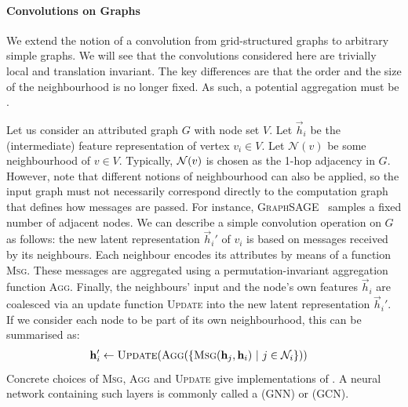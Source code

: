 \documentclass[
	fontsize=10pt, %
	twoside=true, %
	secnumdepth=1, %
  toc=indentunnumbered %
]{kaobook}
\begin{document}
\paragraph{Convolutions on Graphs} We extend the notion of a convolution
from grid-structured graphs to arbitrary simple graphs. We will see that
the convolutions considered here are trivially local and translation invariant.
The key differences are that the order and the size of the neighbourhood is no
longer fixed. As such, a potential aggregation must be .

Let us consider an attributed graph
$G$ with node set $V$.
Let $\vec h_i$ be the (intermediate) feature representation of vertex $v_i \in
V$. Let $\mathcal{N}(v)$ be some neighbourhood of $v \in V$. Typically,
$\mathcal{N}(v)$ is chosen as the 1-hop adjacency in $G$. However, note that
different notions of neighbourhood can also be applied, so the input graph must
not necessarily correspond directly to the computation graph that defines how
messages are passed. For instance, \textsc{GraphSAGE}~\cite{hamilton_InductiveRepresentationLearning_2018} samples a fixed number of
adjacent nodes. We can describe a simple convolution operation on $G$ as
follows: the new latent representation $\vec h_i'$ of $v_i$ is based on messages
received by its neighbours. Each neighbour encodes its attributes by means of a
function \textsc{Msg}. These messages are aggregated using a
permutation-invariant aggregation function \textsc{Agg}.
Finally, the neighbours' input and the node's own features $\vec h_i$ are
coalesced via an update function \textsc{Update} into the new latent
representation $\vec h_i'$. If we consider each node to be part of its own
neighbourhood, this can be summarised as:
\begin{align}
  & \vec h_i' \gets \textsc{Update}(\textsc{Agg}(\{\textsc{Msg}(\vec h_j, \vec h_i) ~|~ j \in \mathcal{N}_i\}))
    \label{eq:gnn-framework}
\end{align}
Concrete choices of \textsc{Msg}, \textsc{Agg} and \textsc{Update} give
implementations of . A neural network containing
such layers is commonly called a  (GNN)
or  (GCN).
\end{document}
